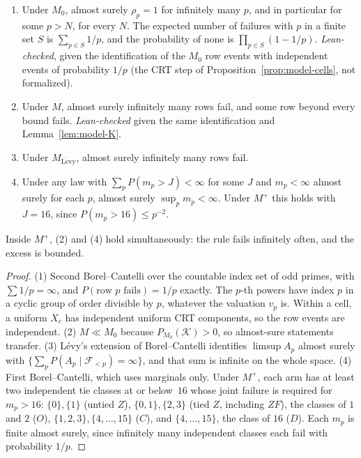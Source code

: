 \begin{theorem}
\label{thm:model-io}
\leavevmode
\begin{enumerate}
\item Under $M_0$, almost surely $\rho_p=1$ for infinitely many $p$, and in
      particular for some $p>N$, for every $N$.  The expected number of
      failures with $p$ in a finite set $S$ is $\sum_{p\in S}1/p$, and the
      probability of none is $\prod_{p\in S}(1-1/p)$.
      \emph{Lean-checked}, given the identification of the $M_0$ row events
      with independent events of probability $1/p$ (the CRT step of
      Proposition~\ref{prop:model-cells}, not formalized).
\item Under $M$, almost surely infinitely many rows fail, and some row
      beyond every bound fails.  \emph{Lean-checked} given the same
      identification and Lemma~\ref{lem:model-K}.
\item Under $M_{\mathrm{L\acute evy}}$, almost surely infinitely many rows fail.
\item Under any law with $\sum_pP(m_p>J)<\infty$ for some $J$ and $m_p<\infty$
      almost surely for each $p$, almost surely $\sup_pm_p<\infty$.  Under
      $M^+$ this holds with $J=16$, since $P(m_p>16)\leq p^{-2}$.
\end{enumerate}
Inside $M^+$, (2) and (4) hold simultaneously: the rule fails infinitely
often, and the excess is bounded.
\end{theorem}

\begin{proof}
(1) Second Borel--Cantelli over the countable index set of odd primes, with
$\sum1/p=\infty$, and $P(\text{row }p\text{ fails})=1/p$ exactly.  The
$p$-th powers have index $p$ in a cyclic group of order divisible by $p$,
whatever the valuation $v_p$ is.  Within a cell, a uniform $X_c$ has
independent uniform CRT components, so the row events are independent.
(2) $M\ll M_0$ because $P_{M_0}(\mathcal K)>0$, so almost-sure statements
transfer.  (3) L\'evy's extension of Borel--Cantelli \cite{durrett2019}
identifies $\limsup A_p$ almost surely with
$\{\sum_pP(A_p\mid\mathcal F_{<p})=\infty\}$, and that sum is infinite on the
whole space.  (4) First Borel--Cantelli, which uses marginals only.  Under
$M^+$, each arm has at least two independent tie classes at or below~$16$
whose joint failure is required for $m_p>16$: $\{0\},\{1\}$ (untied $Z$),
$\{0,1\},\{2,3\}$ (tied $Z$, including $ZF$), the classes of $1$ and $2$ ($O$),
$\{1,2,3\},\{4,\dots,15\}$ ($C$), and $\{4,\dots,15\}$, the class of $16$
($D$).  Each $m_p$ is finite almost surely, since infinitely many independent
classes each fail with probability $1/p$.
\end{proof}

